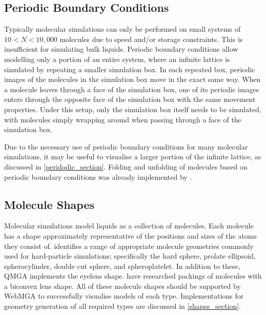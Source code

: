 \subsection{Periodic Boundary Conditions}
\label{pbc_explain}
Typically molecular simulations can only be performed on small systems of $10<N<10,000$ molecules due to speed and/or storage constraints. This is insufficient for simulating bulk liquids. Periodic boundary conditions allow modelling only a portion of an entire system\cite{gabriel2008molecular}, where an infinite lattice is simulated by repeating a smaller simulation box\cite{wu2014applying}. In each repeated box, periodic images of the molecules in the simulation box move in the exact same way. When a molecule leaves through a face of the simulation box, one of its periodic images enters through the opposite face of the simulation box with the same movement properties. Under this setup, only the simulation box itself needs to be simulated, with molecules simply wrapping around when passing through a face of the simulation box.

Due to the necessary use of periodic boundary conditions for many molecular simulations, it may be useful to visualise a larger portion of the infinite lattice, as discussed in \cref{peridodic_section}. Folding and unfolding of molecules based on periodic boundary conditions was already implemented by \textcite{webmga_2}.

\subsection{Molecule Shapes}
Molecular simulations model liquids as a collection of molecules. Each molecule has a shape approximately representative of the positions and sizes of the atoms they consist of. \textcite{allen2019molecular} identifies a range of appropriate molecule geometries commonly used for hard-particle simulations; specifically the hard sphere, prolate ellipsoid, spherocylinder, double cut sphere, and spheroplatelet. In addition to these, QMGA implements the eyelens shape. \textcite{cinacchi2019hard} have researched packings of molecules with a biconvex lens shape. All of these molecule shapes should be supported by WebMGA to successfully visualise models of each type. Implementations for geometry generation of all required types are discussed in \cref{shapes_section}.

